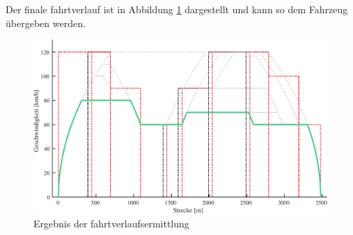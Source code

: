 Der finale \Gls{fahrtverlauf} ist in Abbildung \ref{fig:it13} dargestellt und kann so dem Fahrzeug übergeben werden.
\begin{figure}
  \includegraphics[width=\linewidth]{../images/matlab/it13.pdf}
  \caption{Ergebnis der \Gls{fahrtverlauf}sermittlung}
  \label{fig:it13}
\end{figure}

